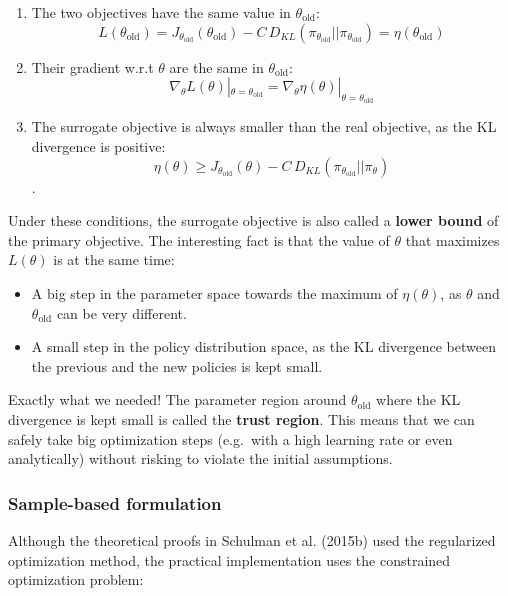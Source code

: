 \documentclass[
  letterpaper,
  DIV=11,
  numbers=noendperiod]{scrreprt}
\providecommand{\tightlist}{%
  \setlength{\itemsep}{0pt}\setlength{\parskip}{0pt}}\usepackage{longtable,booktabs,array}
\begin{document}
\begin{enumerate}
\def\labelenumi{\arabic{enumi}.}
\tightlist
\item
  The two objectives have the same value in \(\theta_\text{old}\):
  \[L(\theta_\text{old}) = J_{\theta_\text{old}}(\theta_\text{old}) - C \,  D_{KL}(\pi_{\theta_\text{old}} || \pi_{\theta_\text{old}}) = \eta(\theta_\text{old})\]
\item
  Their gradient w.r.t \(\theta\) are the same in \(\theta_\text{old}\):
  \[\nabla_\theta L(\theta)|_{\theta = \theta_\text{old}} = \nabla_\theta \eta(\theta)|_{\theta = \theta_\text{old}}\]
\item
  The surrogate objective is always smaller than the real objective, as
  the KL divergence is positive:
  \[\eta(\theta) \geq J_{\theta_\text{old}}(\theta) - C \,  D_{KL}(\pi_{\theta_\text{old}} || \pi_\theta)\].
\end{enumerate}

Under these conditions, the surrogate objective is also called a
\textbf{lower bound} of the primary objective. The interesting fact is
that the value of \(\theta\) that maximizes \(L(\theta)\) is at the same
time:

\begin{itemize}
\tightlist
\item
  A big step in the parameter space towards the maximum of
  \(\eta(\theta)\), as \(\theta\) and \(\theta_\text{old}\) can be very
  different.
\item
  A small step in the policy distribution space, as the KL divergence
  between the previous and the new policies is kept small.
\end{itemize}

Exactly what we needed! The parameter region around
\(\theta_\text{old}\) where the KL divergence is kept small is called
the \textbf{trust region}. This means that we can safely take big
optimization steps (e.g.~with a high learning rate or even analytically)
without risking to violate the initial assumptions.

\hypertarget{sample-based-formulation}{%
\subsubsection*{Sample-based
formulation}\label{sample-based-formulation}}

Although the theoretical proofs in Schulman et al. (2015b) used the
regularized optimization method, the practical implementation uses the
constrained optimization problem:
\end{document}
